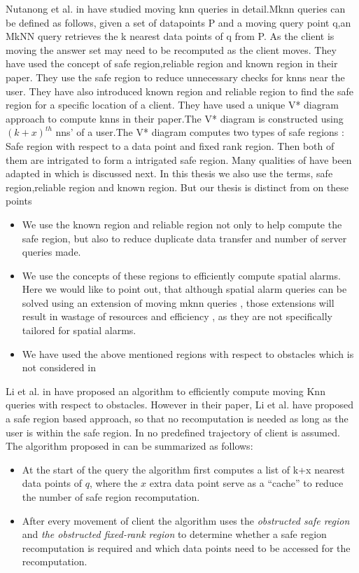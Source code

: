 Nutanong et al. in \cite{mknn} have studied moving knn queries in detail.Mknn queries can be defined as follows, given a set of datapoints P and a moving query point q,an MkNN query retrieves the k nearest data points of q from P. As the client is moving the answer set may need to be recomputed as the client moves. They have used the concept of safe region,reliable region and known region in their paper. They use the safe region to reduce unnecessary checks for knns near the user. They have also introduced known region and reliable region to find the safe region for a specific location of a client. They have used a unique V* diagram approach to compute knns in their paper.The V* diagram is constructed using $(k+x)^{th}$ nns' of a user.The V* diagram computes two types of safe regions : Safe region with respect to a data point and fixed rank region. Then both of them are intrigated to form a intrigated safe region. Many qualities of\cite{mknn} have been adapted in \cite{oknn} which is discussed next. In this thesis we also use the terms, safe region,reliable region and known region. But our thesis is distinct from \cite{mknn} on these points 
\begin{itemize}
\item We use the known region and reliable region not only to help compute the safe region, but also to reduce duplicate data transfer and number of server queries made.
\item We use the concepts of these regions to efficiently compute spatial alarms. Here we would like to point out, that although spatial alarm queries can be solved using an extension of moving mknn queries , those extensions will result in wastage of resources and efficiency , as they are not specifically tailored for spatial alarms.
\item We have used the above mentioned regions with respect to obstacles which is not considered in \cite{mknn} 
\end{itemize} 

Li et al. in \cite{oknn} have proposed an algorithm to efficiently compute moving Knn queries with respect to obstacles.  However in their paper, Li et al. have proposed a safe region based approach, so that no recomputation is needed as long as the user is within the safe region. In \cite{oknn} no predefined trajectory of client is assumed. The algorithm proposed in \cite{oknn} can be summarized as follows:
\begin{itemize}
\item At the start of the query the algorithm first computes a  list of k+x nearest data points of $q$, where the $x$ extra data point serve as a “cache” to reduce the number of safe region recomputation.
\item After every movement of client the algorithm uses the \textit{obstructed safe region} and \textit{the obstructed fixed-rank region} to determine whether a safe region recomputation is required and which data points need to be accessed for the recomputation.
\end{itemize}

